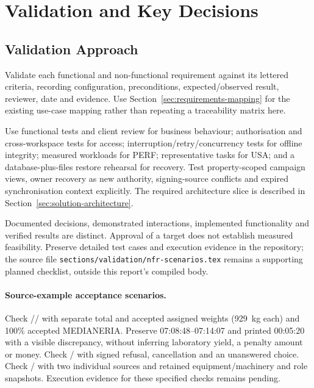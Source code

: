 \section{Validation and Key Decisions}
\label{sec:validation-decisions}\label{sec:validation}
\subsection{Validation Approach}\label{sec:nfr-validation}
Validate each functional and non-functional requirement against its lettered
criteria, recording configuration, preconditions, expected/observed result,
reviewer, date and evidence. Use Section~\ref{sec:requirements-mapping} for the
existing use-case mapping rather than repeating a traceability matrix here.

Use functional tests and client review for business behaviour; authorisation and
cross-workspace tests for access; interruption/retry/concurrency tests for offline
integrity; measured workloads for PERF; representative tasks for USA; and a
database-plus-files restore rehearsal for recovery. Test property-scoped campaign
views, owner recovery as new authority, signing-source conflicts and expired
synchronisation context explicitly. The required architecture slice is described
in Section~\ref{sec:solution-architecture}.

Documented decisions, demonstrated interactions, implemented functionality and
verified results are distinct. Approval of a target does not establish measured
feasibility. Preserve detailed test cases and execution evidence in the repository;
the source file \nolinkurl{sections/validation/nfr-scenarios.tex} remains a supporting
planned checklist, outside this report's compiled body.

\paragraph{Source-example acceptance scenarios.}
Check // with separate total
and accepted assigned weights (929~kg each) and 100\% accepted MEDIANERIA. Preserve
07:08:48--07:14:07 and printed 00:05:20 with a visible discrepancy, without inferring laboratory yield, a penalty amount or money. Check / with signed
refusal, cancellation and an unanswered choice. Check /
with two individual sources and retained equipment/machinery and role snapshots.
Execution evidence for these specified checks remains pending.

